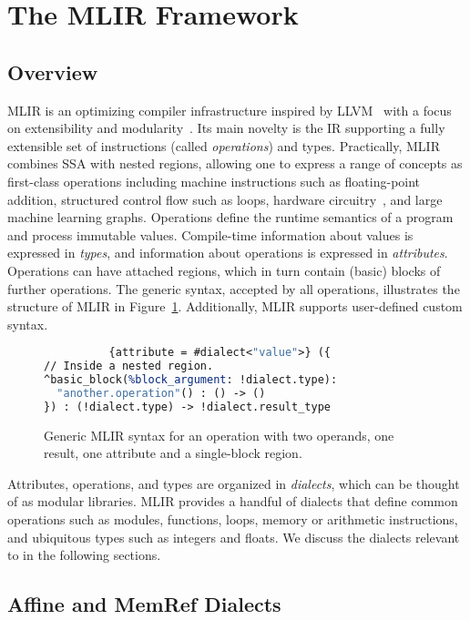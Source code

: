 \section{The MLIR Framework}
\subsection{Overview}
MLIR is an optimizing compiler infrastructure inspired by LLVM~\cite{llvm} with a focus on extensibility and modularity~\cite{mlir}. Its main novelty is the IR supporting a fully extensible set of instructions (called \emph{operations}) and types. Practically, MLIR combines SSA with nested regions, allowing one to express a range of concepts as first-class operations including machine instructions such as floating-point addition, structured control flow such as loops, hardware circuitry~\cite{circt}, and large machine learning graphs. Operations define the runtime semantics of a program and process immutable values. Compile-time information about values is expressed in \emph{types}, and information about operations is expressed in \emph{attributes}. Operations can have attached regions, which in turn contain (basic) blocks of further operations. The generic syntax, accepted by all operations, illustrates the structure of MLIR in Figure~\ref{fig:mlir_syntax}. Additionally, MLIR supports user-defined custom syntax.

\begin{figure}
{
\scriptsize
\begin{lstlisting}[language=llvm,escapeinside=@@, mathescape=true]
%result = "dialect.operation"(%operand, %operand)
          {attribute = #dialect<"value">} ({
// Inside a nested region.
^basic_block(%block_argument: !dialect.type):
  "another.operation"() : () -> ()
}) : (!dialect.type) -> !dialect.result_type
\end{lstlisting}
}
\caption{Generic MLIR syntax for an operation with two operands, one result, one attribute and a single-block region.}
\label{fig:mlir_syntax}
\end{figure}

Attributes, operations, and types are organized in \emph{dialects}, which can be thought of as modular libraries. MLIR provides a handful of dialects that define common operations such as modules, functions, loops, memory or arithmetic instructions, and ubiquitous types such as integers and floats. We discuss the dialects relevant to \tool in the following sections.

\subsection{Affine and MemRef Dialects}\label{sec:affine_memref}

